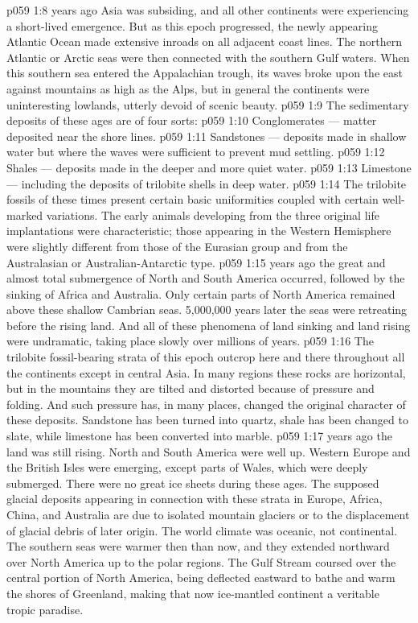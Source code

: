 \vs p059 1:8 \pc {} years ago Asia was subsiding, and all other continents were experiencing a short\hyp{}lived emergence. But as this epoch progressed, the newly appearing Atlantic Ocean made extensive inroads on all adjacent coast lines. The northern Atlantic or Arctic seas were then connected with the southern Gulf waters. When this southern sea entered the Appalachian trough, its waves broke upon the east against mountains as high as the Alps, but in general the continents were uninteresting lowlands, utterly devoid of scenic beauty.
\vs p059 1:9 \pc The sedimentary deposits of these ages are of four sorts:
\vs p059 1:10 \bibnobreakspace Conglomerates --- matter deposited near the shore lines.
\vs p059 1:11 \bibnobreakspace Sandstones --- deposits made in shallow water but where the waves were sufficient to prevent mud settling.
\vs p059 1:12 \bibnobreakspace Shales --- deposits made in the deeper and more quiet water.
\vs p059 1:13 \bibnobreakspace Limestone --- including the deposits of trilobite shells in deep water.
\vs p059 1:14 \pc The trilobite fossils of these times present certain basic uniformities coupled with certain well\hyp{}marked variations. The early animals developing from the three original life implantations were characteristic; those appearing in the Western Hemisphere were slightly different from those of the Eurasian group and from the Australasian or Australian\hyp{}Antarctic type.
\vs p059 1:15 \pc {} years ago the great and almost total submergence of North and South America occurred, followed by the sinking of Africa and Australia. Only certain parts of North America remained above these shallow Cambrian seas. 5,000,000 years later the seas were retreating before the rising land. And all of these phenomena of land sinking and land rising were undramatic, taking place slowly over millions of years.
\vs p059 1:16 The trilobite fossil\hyp{}bearing strata of this epoch outcrop here and there throughout all the continents except in central Asia. In many regions these rocks are horizontal, but in the mountains they are tilted and distorted because of pressure and folding. And such pressure has, in many places, changed the original character of these deposits. Sandstone has been turned into quartz, shale has been changed to slate, while limestone has been converted into marble.
\vs p059 1:17 \pc {} years ago the land was still rising. North and South America were well up. Western Europe and the British Isles were emerging, except parts of Wales, which were deeply submerged. There were no great ice sheets during these ages. The supposed glacial deposits appearing in connection with these strata in Europe, Africa, China, and Australia are due to isolated mountain glaciers or to the displacement of glacial debris of later origin. The world climate was oceanic, not continental. The southern seas were warmer then than now, and they extended northward over North America up to the polar regions. The Gulf Stream coursed over the central portion of North America, being deflected eastward to bathe and warm the shores of Greenland, making that now ice\hyp{}mantled continent a veritable tropic paradise.
